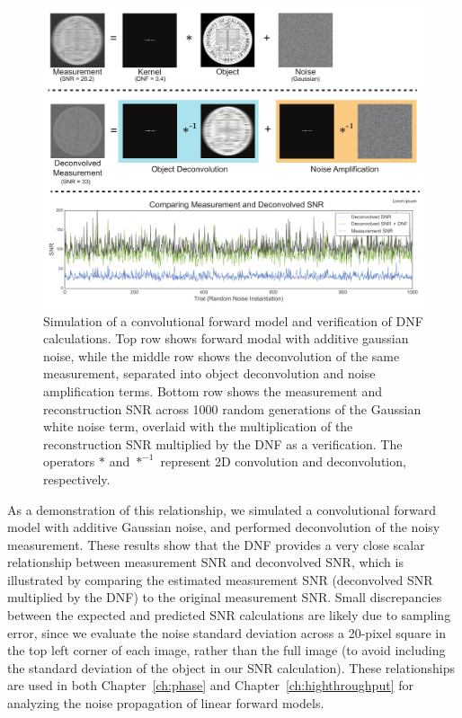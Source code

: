\begin{figure}[tbh]
\centering
\includegraphics[width=\textwidth]{figures/fig_intro_dnf.pdf}
\caption{\label{fig:intro:dnf} Simulation of a convolutional forward model and verification of DNF calculations. Top row shows forward modal with additive gaussian noise, while the middle row shows the deconvolution of the same measurement, separated into object deconvolution and noise amplification terms. Bottom row shows the measurement and reconstruction SNR across 1000 random generations of the Gaussian white noise term, overlaid with the multiplication of the reconstruction SNR multiplied by the DNF as a verification. The operators $*$ and $*^{-1}$ represent 2D convolution and deconvolution, respectively.}
\end{figure}

As a demonstration of this relationship, we simulated a convolutional forward model with additive Gaussian noise, and performed deconvolution of the noisy measurement. These results show that the DNF provides a very close scalar relationship between measurement SNR and deconvolved SNR, which is illustrated by comparing the estimated measurement SNR (deconvolved SNR multiplied by the DNF) to the original measurement SNR. Small discrepancies between the expected and predicted SNR calculations are likely due to sampling error, since we evaluate the noise standard deviation across a 20-pixel square in the top left corner of each image, rather than the full image (to avoid including the standard deviation of the object in our SNR calculation). These relationships are used in both Chapter~\ref{ch:phase} and Chapter~\ref{ch:highthroughput} for analyzing the noise propagation of linear forward models.

